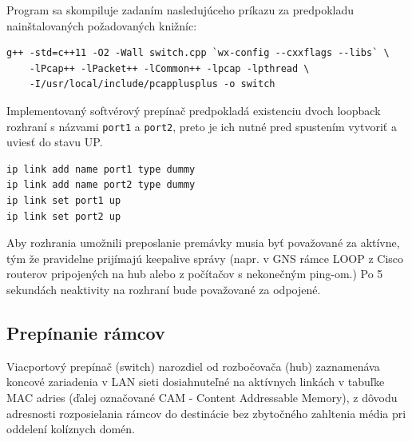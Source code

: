 \documentclass[12pt, a4paper]{article}
\begin{document}
Program sa skompiluje zadaním nasledujúceho príkazu za predpokladu nainštalovaných požadovaných knižníc:
\begin{verbatim}
g++ -std=c++11 -O2 -Wall switch.cpp `wx-config --cxxflags --libs` \
    -lPcap++ -lPacket++ -lCommon++ -lpcap -lpthread \
    -I/usr/local/include/pcapplusplus -o switch
\end{verbatim}

Implementovaný softvérový prepínač predpokladá existenciu dvoch loopback rozhraní s názvami \verb|port1| a \verb|port2|, 
preto je ich nutné pred spustením vytvoriť a uviesť do stavu UP.
\begin{verbatim}
ip link add name port1 type dummy
ip link add name port2 type dummy
ip link set port1 up
ip link set port2 up
\end{verbatim}
Aby rozhrania umožnili preposlanie premávky musia byť považované za aktívne, tým že pravidelne prijímajú
keepalive správy (napr. v GNS rámce LOOP z Cisco routerov pripojených na hub alebo z počítačov s nekonečným ping-om.)
Po 5 sekundách neaktivity na rozhraní bude považované za odpojené.

\subsection{Prepínanie rámcov}
Viacportový prepínač (switch) narozdiel od rozbočovača (hub) zaznamenáva koncové zariadenia v LAN sieti 
dosiahnuteľné na aktívnych linkách v tabuľke MAC adries (ďalej označované CAM - Content Addressable Memory), 
z dôvodu adresnosti rozposielania rámcov do destinácie bez zbytočného zahltenia média pri oddelení kolíznych domén.
\end{document}
